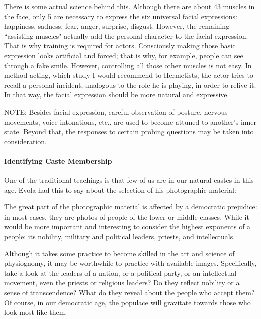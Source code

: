 There is some actual science behind this. Although there are about 43 muscles in the face, only 5 are necessary to express the six universal facial expressions: happiness, sadness, fear, anger, surprise, disgust. However, the remaining ``assisting muscles" actually add the personal character to the facial expression. That is why training is required for actors. Consciously making those basic expression looks artificial and forced; that is why, for example, people can see through a fake smile. However, controlling all those other muscles is not easy. In method acting, which study I would recommend to Hermetists, the actor tries to recall a personal incident, analogous to the role he is playing, in order to relive it. In that way, the facial expression should be more natural and expressive.

NOTE: Besides facial expression, careful observation of posture, nervous movements, voice intonations, etc., are used to become attuned to another's inner state. Beyond that, the responses to certain probing questions may be taken into consideration.

\paragraph{Identifying Caste Membership}
One of the traditional teachings is that few of us are in our natural castes in this age. Evola had this to say about the selection of his photographic material:

\begin{quotex}
The great part of the photographic material is affected by a democratic prejudice: in most cases, they are photos of people of the lower or middle classes. While it would be more important and interesting to consider the highest exponents of a people: its nobility, military and political leaders, priests, and intellectuals. 

\end{quotex}
Although it takes some practice to become skilled in the art and science of physiognomy, it may be worthwhile to practice with available images. Specifically, take a look at the leaders of a nation, or a political party, or an intellectual movement, even the priests or religious leaders? Do they reflect nobility or a sense of transcendence? What do they reveal about the people who accept them? Of course, in our democratic age, the populace will gravitate towards those who look most like them.

